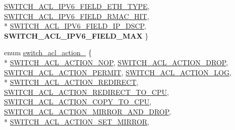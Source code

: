 \begin{DoxyCompactItemize}
\hyperlink{group__ACL_gga129df7ad73db6209bc9a5f28696408dba5365dd0d3cb8d71b46da7dfeffb6d760}{S\+W\+I\+T\+C\+H\+\_\+\+A\+C\+L\+\_\+\+I\+P\+V6\+\_\+\+F\+I\+E\+L\+D\+\_\+\+E\+T\+H\+\_\+\+T\+Y\+P\+E}, 
\hyperlink{group__ACL_gga129df7ad73db6209bc9a5f28696408dbacbeefa4021bde0c1deac2dbe89b99c87}{S\+W\+I\+T\+C\+H\+\_\+\+A\+C\+L\+\_\+\+I\+P\+V6\+\_\+\+F\+I\+E\+L\+D\+\_\+\+R\+M\+A\+C\+\_\+\+H\+I\+T}, 
\\*
\hyperlink{group__ACL_gga129df7ad73db6209bc9a5f28696408dbaba9e28d264efc09e636adfa55d2689df}{S\+W\+I\+T\+C\+H\+\_\+\+A\+C\+L\+\_\+\+I\+P\+V6\+\_\+\+F\+I\+E\+L\+D\+\_\+\+I\+P\+\_\+\+D\+S\+C\+P}, 
{\bfseries S\+W\+I\+T\+C\+H\+\_\+\+A\+C\+L\+\_\+\+I\+P\+V6\+\_\+\+F\+I\+E\+L\+D\+\_\+\+M\+A\+X}
 \}
\item 
enum \hyperlink{group__ACL_ga55dd1b7b278fc8fe549b0025fd93837c}{switch\+\_\+acl\+\_\+action\+\_\+} \{ \\*
\hyperlink{group__ACL_gga55dd1b7b278fc8fe549b0025fd93837ca160bd82529e98f3928c960d0c0541733}{S\+W\+I\+T\+C\+H\+\_\+\+A\+C\+L\+\_\+\+A\+C\+T\+I\+O\+N\+\_\+\+N\+O\+P}, 
\hyperlink{group__ACL_gga55dd1b7b278fc8fe549b0025fd93837ca03c251de32ed8c6bac947648f2173ffe}{S\+W\+I\+T\+C\+H\+\_\+\+A\+C\+L\+\_\+\+A\+C\+T\+I\+O\+N\+\_\+\+D\+R\+O\+P}, 
\hyperlink{group__ACL_gga55dd1b7b278fc8fe549b0025fd93837cad14781927ce78516be140c8dcf9c31ca}{S\+W\+I\+T\+C\+H\+\_\+\+A\+C\+L\+\_\+\+A\+C\+T\+I\+O\+N\+\_\+\+P\+E\+R\+M\+I\+T}, 
\hyperlink{group__ACL_gga55dd1b7b278fc8fe549b0025fd93837ca3172b092f35816d20192faad1f64559b}{S\+W\+I\+T\+C\+H\+\_\+\+A\+C\+L\+\_\+\+A\+C\+T\+I\+O\+N\+\_\+\+L\+O\+G}, 
\\*
\hyperlink{group__ACL_gga55dd1b7b278fc8fe549b0025fd93837cae2c1ca99eae226451ecfcb715573ac29}{S\+W\+I\+T\+C\+H\+\_\+\+A\+C\+L\+\_\+\+A\+C\+T\+I\+O\+N\+\_\+\+R\+E\+D\+I\+R\+E\+C\+T}, 
\hyperlink{group__ACL_gga55dd1b7b278fc8fe549b0025fd93837ca4bb4071bcd26ca1f9890bacd6fc44118}{S\+W\+I\+T\+C\+H\+\_\+\+A\+C\+L\+\_\+\+A\+C\+T\+I\+O\+N\+\_\+\+R\+E\+D\+I\+R\+E\+C\+T\+\_\+\+T\+O\+\_\+\+C\+P\+U}, 
\hyperlink{group__ACL_gga55dd1b7b278fc8fe549b0025fd93837ca6c6b389fa76eca7337eea8a526f1ccdd}{S\+W\+I\+T\+C\+H\+\_\+\+A\+C\+L\+\_\+\+A\+C\+T\+I\+O\+N\+\_\+\+C\+O\+P\+Y\+\_\+\+T\+O\+\_\+\+C\+P\+U}, 
\hyperlink{group__ACL_gga55dd1b7b278fc8fe549b0025fd93837cac0386fee803341b39dd2ea8221daa464}{S\+W\+I\+T\+C\+H\+\_\+\+A\+C\+L\+\_\+\+A\+C\+T\+I\+O\+N\+\_\+\+M\+I\+R\+R\+O\+R\+\_\+\+A\+N\+D\+\_\+\+D\+R\+O\+P}, 
\\*
\hyperlink{group__ACL_gga55dd1b7b278fc8fe549b0025fd93837ca818b908c74eb7e5d4fcb9a399d5fe2dd}{S\+W\+I\+T\+C\+H\+\_\+\+A\+C\+L\+\_\+\+A\+C\+T\+I\+O\+N\+\_\+\+S\+E\+T\+\_\+\+M\+I\+R\+R\+O\+R}, 

\end{DoxyCompactItemize}
